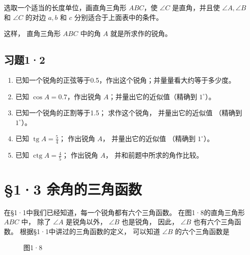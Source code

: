 选取一个适当的长度单位，画直角三角形 \(ABC\)，使 \(\angle C\)
是直角，并且使 \(\angle A, \angle B\) 和 \(\angle C\) 的对边 \(a, b\) 和
\(c\) 分别适合于上面表中的条件。

这样， 直角三角形 \(ABC\) 中的角 \(A\) 就是所求作的锐角。

\subsection{习题1·2}

\begin{enumerate}
\item
  已知一个锐角的正弦等于0.5，作出这个锐角；并量量看大约等于多少度。
\item
  已知 \(\cos A = 0.7\)，作出锐角 \(A\)；并量出它的近似值（精确到
  \(1^{\circ}\)）。
\item
  已知一个锐角的正割等于1.5； 求作这个锐角， 并量出它的近似值 （精确到
  \(1^{\circ}\)）。
\item
  已知 \(\operatorname{tg} A = \frac{5}{4}\)； 作出锐角 \(A\)，
  并量出它的近似值 （精确到 \(1^{\circ}\)）。
\item
  已知 \(\operatorname{ctg} A = \frac{4}{5}\)； 作出锐角 \(A\)，
  并和前题中所求的角作比较。
\end{enumerate}

\section{§1·3 余角的三角函数}

在§1·1中我们已经知道，每一个锐角都有六个三角函数。 在图1·8的直角三角形
\(ABC\) 中， 除了 \(\angle A\) 是锐角以外， \(\angle B\) 也是锐角，
因此， \(\angle B\) 也有六个三角函数。 根据§1·1中讲过的三角函数的定义，
可以知道 \(\angle B\) 的六个三角函数是

\begin{figure}
\centering
{}
\caption{图1·8}
\end{figure}


